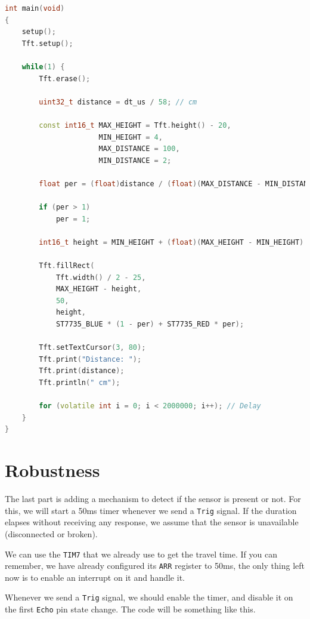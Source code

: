 \documentclass{article}
\begin{document}
\begin{lstlisting}[language=C++, caption={Main loop}]
int main(void)
{
    setup();
    Tft.setup();

    while(1) {
        Tft.erase();
    
        uint32_t distance = dt_us / 58; // cm

        const int16_t MAX_HEIGHT = Tft.height() - 20,
                      MIN_HEIGHT = 4,
                      MAX_DISTANCE = 100,
                      MIN_DISTANCE = 2;

        float per = (float)distance / (float)(MAX_DISTANCE - MIN_DISTANCE);

        if (per > 1)
            per = 1;

        int16_t height = MIN_HEIGHT + (float)(MAX_HEIGHT - MIN_HEIGHT) * per;

        Tft.fillRect(
            Tft.width() / 2 - 25,
            MAX_HEIGHT - height,
            50,
            height,
            ST7735_BLUE * (1 - per) + ST7735_RED * per);

        Tft.setTextCursor(3, 80);
        Tft.print("Distance: ");
        Tft.print(distance);
        Tft.println(" cm");

        for (volatile int i = 0; i < 2000000; i++); // Delay
    }
}
\end{lstlisting}

\section{Robustness}

The last part is adding a mechanism to detect if the sensor is present or not. For this, we will start a 50ms timer whenever we send a \verb|Trig| signal. If the duration elapses without receiving any response, we assume that the sensor is unavailable (disconnected or broken).

We can use the \verb|TIM7| that we already use to get the travel time. If you can remember, we have already configured its \verb|ARR| register to 50ms, the only thing left now is to enable an interrupt on it and handle it.

Whenever we send a \verb|Trig| signal, we should enable the timer, and disable it on the first \verb|Echo| pin state change. The code will be something like this.
\end{document}
